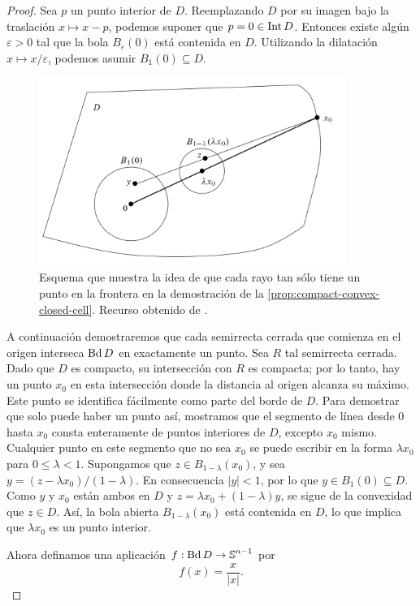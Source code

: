 \begin{proof}
	Sea $p$ un punto interior de $D$. Reemplazando $D$ por su imagen bajo la
	traslación $x \mapsto x - p$, podemos suponer que $p = 0 \in \operatorname{Int} D$.
	Entonces existe algún $\varepsilon > 0$ tal que la bola $B_{\varepsilon}(0)$
	está contenida en $D$. Utilizando la dilatación $x \mapsto x/\varepsilon$,
	podemos asumir $B_{1}(0) \subseteq D$.
	\begin{figure}
		\centering
		\includegraphics[width=10cm]{img/proof-cell.png}
		\caption{Esquema que muestra la idea de que cada rayo tan sólo tiene un
			punto en la frontera en la demostración de la
			\autoref{prop:compact-convex-closed-cell}. Recurso obtenido de \cite{lee2010introduction}.}
	\end{figure}
	A continuación demostraremos que cada semirrecta cerrada que comienza en el origen
	interseca $\operatorname{Bd} D$ en exactamente un punto. Sea $R$ tal semirrecta cerrada. Dado
	que $D$ es compacto, su intersección con $R$ es compacta; por lo tanto, hay un
	punto $x_{0}$ en esta intersección donde la distancia al origen alcanza su
	máximo. Este punto se identifica fácilmente como parte del borde de $D$. Para
	demostrar que solo puede haber un punto así, mostramos que el segmento de línea
	desde $0$ hasta $x_{0}$ consta enteramente de puntos interiores de $D$,
	excepto $x_{0}$ mismo. Cualquier punto en este segmento que no sea $x_{0}$ se puede
	escribir en la forma $\lambda x_{0}$ para $0 \leq \lambda < 1$. Supongamos que
	$z \in B_{1-\lambda}(x_{0})$, y sea $y = (z - \lambda x_{0})/(1 - \lambda)$.
	En consecuencia $|y| < 1$, por lo que $y \in B_{1}(0) \subseteq D$. Como $y$ y
	$x_{0}$ están ambos en $D$ y $z = \lambda x_{0} + (1 - \lambda)y$, se sigue de
	la convexidad que $z \in D$. Así, la bola abierta $B_{1-\lambda}(x_{0})$ está contenida
	en $D$, lo que implica que $\lambda x_{0}$ es un punto interior.
	
	Ahora definamos una aplicación $f : \operatorname{Bd} D \to \operatorname{\mathbb{S}}^{n-1}$ por
	\[
	f(x) = \frac{x}{|x|}.
	\]
	

\end{proof}

